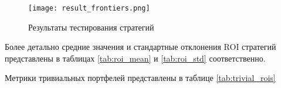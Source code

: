 \begin{figure}[H]
	\centering
	\texttt{[image: result\_frontiers.png]}
	\caption{Результаты тестирования стратегий}
	\label{fig:result_frontier}
\end{figure}

Более детально средние значения и стандартные отклонения ROI стратегий представлены в таблицах
\ref{tab:roi_mean} и \ref{tab:roi_std} соответственно.

Метрики тривиальных портфелей представлены в таблице \ref{tab:trivial_rois}







